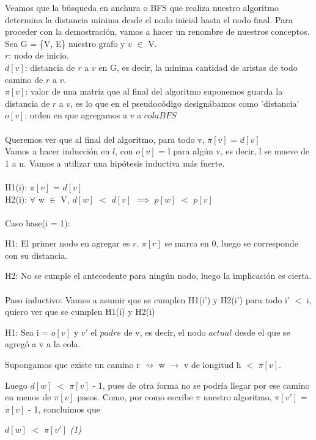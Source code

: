 \documentclass[11pt, a4paper, twoside]{article}
\begin{document}
{}
Veamos que la búsqueda en anchura o BFS que realiza nuestro algoritmo determina la distancia mínima desde el nodo inicial hasta el nodo final.
Para proceder con la demostración, vamos a hacer un renombre de nuestros conceptos.
\\ Sea G = \{V, E\} nuestro grafo y $v$ $\in$ V.
\\ $r$: nodo de inicio.
\\ $d[v]$: distancia de $r$ a $v$ en G, es decir, la minima cantidad de aristas de todo camino de $r$ a $v$.
\\ $\pi[v]$: valor de una matriz que al final del algoritmo suponemos guarda la distancia de $r$ a $v$, es lo que en el pseudocódigo designábamos como 'distancia'
\\$o[v]$: orden en que agregamos a $v$ a $colaBFS$
\\\\Queremos ver que al final del algoritmo, para todo v, $\pi[v]$ = $d[v]$
\\Vamos a hacer inducción en $l$, con $o[v]$ = l para algún v, es decir, l se mueve de 1 a n. Vamos a utilizar una hipótesis inductiva más fuerte.
\\\\H1(i): $\pi[v]$ = $d[v]$
\\H2(i): $\forall$ w $\in$ V, $d[w]$ $<$ $d[v]$ $\implies$ $p[w]$ $<$ $p[v]$
\\\\Caso base(i = 1): 

H1: El primer nodo en agregar es $r$. $\pi[r]$ se marca en 0, luego se corresponde con su distancia.

H2: No se cumple el antecedente para ningún nodo, luego la implicación es cierta.
\\\\Paso inductivo: Vamos a asumir que se cumplen H1(i') y H2(i') para todo i' $<$ i, quiero ver que se cumplen H1(i) y H2(i)

H1: Sea i = $o[v]$ y $v'$ el $padre$ de v, es decir, el nodo $actual$ desde el que se agregó a v a la cola.

Supongamos que existe un camino r $\rightsquigarrow$ w $\rightarrow$ v
de longitud h $<$ $\pi[v]$.

Luego $d[w]$ $<$ $\pi[v]$ - 1, pues de otra forma no se podría llegar por ese camino en menos de $\pi[v]$ pasos.
Como, por como escribe $\pi$ nuestro algoritmo, $\pi[v']$ = $\pi[v]$ - 1, concluimos que

$d[w]$ $<$ $\pi[v']$ \hfill\emph{(1)}
\end{document}
